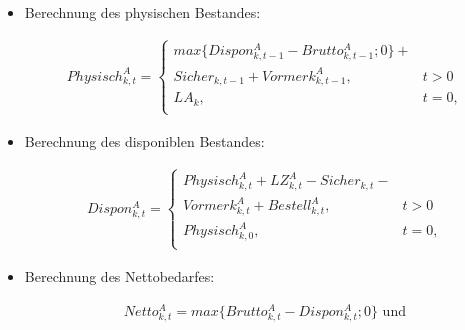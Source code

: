\begin{algorithmic}
\begin{itemize} [leftmargin=*]
\begin{enumerate} [leftmargin=1.5em, label=]
\begin{enumerate} [leftmargin=*, label= \arabic*.]
\begin{itemize} [leftmargin=*]
                    \item Berechnung des physischen Bestandes:
                    \begin{fleqn}[0cm]
                        \begin{align*}
                        Physisch^{A}_{k,t} = \begin{cases}	 max\{Dispon^{A}_{k,t-1} -Brutto^{A}_{k,t-1}; 0\} + \\
                        Sicher_{k,t-1} + Vormerk^{A}_{k,t-1},   
                        & t > 0  \\
                        LA_{k},    	   &  t = 0\text{,}  \\
                        \end{cases}
                        \end{align*}
                    \end{fleqn}
                    
                    \item Berechnung des disponiblen Bestandes:
                    
                    \begin{fleqn}
                        \begin{align*}
                        Dispon^{A}_{k,t} = \begin{cases}	 Physisch^{A}_{k,t} + LZ^{A}_{k,t} - Sicher_{k,t} -    \\
                        Vormerk^{A}_{k,t} + Bestell^{A}_{k,t},   
                        & t > 0  \\
                        Physisch^{A}_{k,0},    	   &  t = 0\text{,}  \\
                        \end{cases}
                        \end{align*}
                    \end{fleqn}
                    
                    \item Berechnung des Nettobedarfes:
                    
                    \begin{fleqn}
                        \begin{align*}
                        Netto^{A}_{k,t} = max \{Brutto^{A}_{k,t} - Dispon^{A}_{k,t}; 0 \}\text{ und}
                        \end{align*}
                    \end{fleqn}
                    

\end{itemize}
\end{enumerate}
\end{enumerate}
\end{itemize}
\end{algorithmic}
